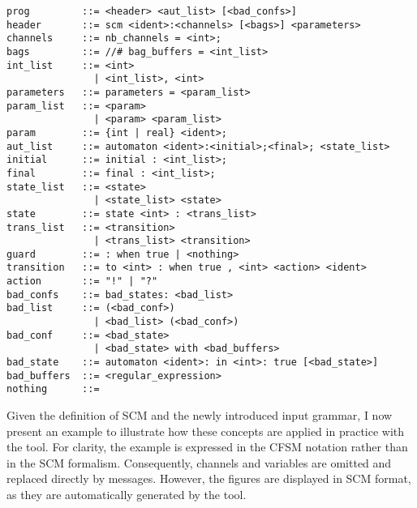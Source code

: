 \begin{lstlisting}[language={},caption={Modified SCM grammar},
    keywordstyle=\color{blue}\bfseries,label={lst:scm-grammar}] 
prog         ::= <header> <aut_list> [<bad_confs>]
header       ::= scm <ident>:<channels> [<bags>] <parameters>
channels     ::= nb_channels = <int>;
bags         ::= //# bag_buffers = <int_list>
int_list     ::= <int>
               | <int_list>, <int>
parameters   ::= parameters = <param_list>
param_list   ::= <param>
               | <param> <param_list>
param        ::= {int | real} <ident>;
aut_list     ::= automaton <ident>:<initial>;<final>; <state_list>
initial      ::= initial : <int_list>;
final        ::= final : <int_list>;
state_list   ::= <state>
               | <state_list> <state>
state        ::= state <int> : <trans_list>
trans_list   ::= <transition>
               | <trans_list> <transition>
guard        ::= : when true | <nothing>
transition   ::= to <int> : when true , <int> <action> <ident>
action       ::= "!" | "?"
bad_confs    ::= bad_states: <bad_list>
bad_list     ::= (<bad_conf>)
               | <bad_list> (<bad_conf>)
bad_conf     ::= <bad_state>
               | <bad_state> with <bad_buffers>
bad_state    ::= automaton <ident>: in <int>: true [<bad_state>]
bad_buffers  ::= <regular_expression>
nothing      ::= 
\end{lstlisting}

Given the definition of SCM and the newly introduced input grammar, 
I now present an example to illustrate how these concepts are applied 
in practice with the tool. For clarity, the example is expressed in the 
CFSM notation rather than in the SCM formalism. Consequently, channels 
and variables are omitted and replaced directly by messages. However, 
the figures are displayed in SCM format, as they are automatically 
generated by the tool.

\bigskip

